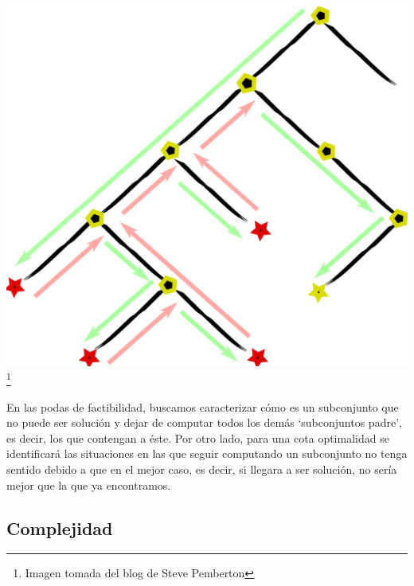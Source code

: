 \documentclass[10pt,a4paper]{article}
\begin{document}
\begin{center}
\includegraphics[scale=.4]{backtrack}
\footnote{Imagen tomada del blog de Steve Pemberton}
\end{center}


En las podas de factibilidad, buscamos caracterizar cómo es un subconjunto que no puede ser solución y dejar de computar todos los demás ‘subconjuntos padre’, es decir, los que contengan a éste. Por otro lado, para una cota optimalidad se identificará las situaciones en las que seguir computando un subconjunto no tenga sentido debido a que en el mejor caso, es decir, si llegara a ser solución, no sería mejor que la que ya encontramos.


\bigskip

\subsection{Complejidad}
\end{document}
